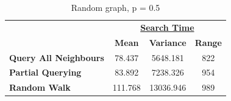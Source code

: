 \documentclass[12pt,a4paper]{article}
\begin{document}
\vspace{30mm}

\begin{table}[h]
	\centering
	\begin{tabular}{lccc}
		& \multicolumn{3}{c}{{\ul \textbf{Search Time}}}                                                                    \\ \cline{2-4} 
		\multicolumn{1}{l|}{}                               & \multicolumn{1}{c|}{\textbf{Mean}} & \multicolumn{1}{c|}{\textbf{Variance}} & \multicolumn{1}{c|}{\textbf{Range}} \\ \hline
		\multicolumn{1}{|l|}{\textbf{Query All Neighbours}} & \multicolumn{1}{c|}{78.437}        & \multicolumn{1}{c|}{5648.181}          & \multicolumn{1}{c|}{822}            \\ \hline
		\multicolumn{1}{|l|}{\textbf{Partial Querying}}     & \multicolumn{1}{c|}{83.892}        & \multicolumn{1}{c|}{7238.326}          & \multicolumn{1}{c|}{954}            \\ \hline
		\multicolumn{1}{|l|}{\textbf{Random Walk}}          & \multicolumn{1}{c|}{111.768}       & \multicolumn{1}{c|}{13036.946}         & \multicolumn{1}{c|}{989}            \\ \hline
	\end{tabular}
	\caption{Random graph, p = 0.5}
\end{table}
\end{document}
